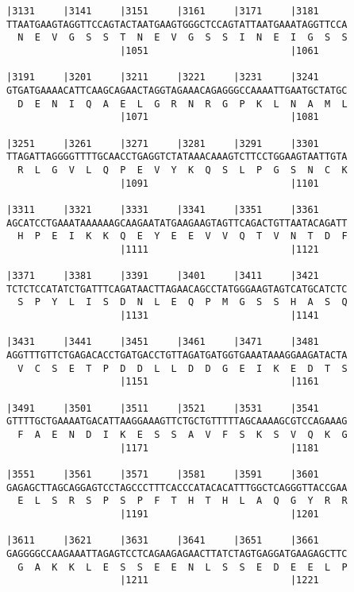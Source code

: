 \documentclass{article}
\begin{document}
\newpage
\begin{Verbatim}[fontfamily=courier]
|3131     |3141     |3151     |3161     |3171     |3181     
TTAATGAAGTAGGTTCCAGTACTAATGAAGTGGGCTCCAGTATTAATGAAATAGGTTCCA
  N  E  V  G  S  S  T  N  E  V  G  S  S  I  N  E  I  G  S  S
                    |1051                         |1061     

|3191     |3201     |3211     |3221     |3231     |3241     
GTGATGAAAACATTCAAGCAGAACTAGGTAGAAACAGAGGGCCAAAATTGAATGCTATGC
  D  E  N  I  Q  A  E  L  G  R  N  R  G  P  K  L  N  A  M  L
                    |1071                         |1081     

|3251     |3261     |3271     |3281     |3291     |3301     
TTAGATTAGGGGTTTTGCAACCTGAGGTCTATAAACAAAGTCTTCCTGGAAGTAATTGTA
  R  L  G  V  L  Q  P  E  V  Y  K  Q  S  L  P  G  S  N  C  K
                    |1091                         |1101     

|3311     |3321     |3331     |3341     |3351     |3361     
AGCATCCTGAAATAAAAAAGCAAGAATATGAAGAAGTAGTTCAGACTGTTAATACAGATT
  H  P  E  I  K  K  Q  E  Y  E  E  V  V  Q  T  V  N  T  D  F
                    |1111                         |1121     

|3371     |3381     |3391     |3401     |3411     |3421     
TCTCTCCATATCTGATTTCAGATAACTTAGAACAGCCTATGGGAAGTAGTCATGCATCTC
  S  P  Y  L  I  S  D  N  L  E  Q  P  M  G  S  S  H  A  S  Q
                    |1131                         |1141     

|3431     |3441     |3451     |3461     |3471     |3481     
AGGTTTGTTCTGAGACACCTGATGACCTGTTAGATGATGGTGAAATAAAGGAAGATACTA
  V  C  S  E  T  P  D  D  L  L  D  D  G  E  I  K  E  D  T  S
                    |1151                         |1161     

|3491     |3501     |3511     |3521     |3531     |3541     
GTTTTGCTGAAAATGACATTAAGGAAAGTTCTGCTGTTTTTAGCAAAAGCGTCCAGAAAG
  F  A  E  N  D  I  K  E  S  S  A  V  F  S  K  S  V  Q  K  G
                    |1171                         |1181     

|3551     |3561     |3571     |3581     |3591     |3601     
GAGAGCTTAGCAGGAGTCCTAGCCCTTTCACCCATACACATTTGGCTCAGGGTTACCGAA
  E  L  S  R  S  P  S  P  F  T  H  T  H  L  A  Q  G  Y  R  R
                    |1191                         |1201     

|3611     |3621     |3631     |3641     |3651     |3661     
GAGGGGCCAAGAAATTAGAGTCCTCAGAAGAGAACTTATCTAGTGAGGATGAAGAGCTTC
  G  A  K  K  L  E  S  S  E  E  N  L  S  S  E  D  E  E  L  P
                    |1211                         |1221     

\end{Verbatim}
\end{document}
